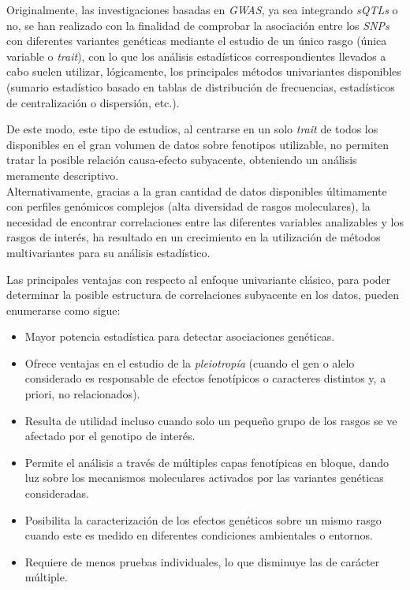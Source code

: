 \documentclass[IB,BIB]{TFUOC}%
\let\oldgls=\gls
\renewcommand{\gls}[1]{{\hypersetup{linkcolor=[RGB]{0,0,0}}
  \oldgls{#1}}}
\begin{document}

Originalmente, las investigaciones basadas en \textit{GWAS}, ya sea integrando \textit{sQTLs} o no, se han realizado con la finalidad de comprobar la asociación entre los \textit{SNPs} con diferentes variantes genéticas mediante el estudio de un único rasgo (única variable o \hspace{-.5em}\textit{\gls{trait}}), con lo que los análisis estadísticos correspondientes llevados a cabo suelen utilizar, lógicamente, los principales métodos univariantes disponibles (sumario estadístico basado en tablas de distribución de frecuencias, estadísticos de centralización o dispersión, etc.).

De este modo, este tipo de estudios, al centrarse en un solo \textit{trait} de todos los disponibles en el gran volumen de datos sobre fenotipos utilizable, no permiten tratar la posible relación causa-efecto subyacente, obteniendo un análisis meramente descriptivo. \\


Alternativamente, gracias a la gran cantidad de datos disponibles últimamente con perfiles genómicos complejos (alta diversidad de rasgos moleculares), la necesidad de encontrar correlaciones entre las diferentes variables analizables y los rasgos de interés, ha resultado en un crecimiento en la utilización de métodos multivariantes para su análisis estadístico.

Las principales ventajas con respecto al enfoque univariante clásico, para poder determinar la posible estructura de correlaciones subyacente en los datos, pueden enumerarse como sigue:

{\small
\begin{itemize}
    \item Mayor potencia estadística para detectar asociaciones genéticas.
    \item Ofrece ventajas en el estudio de la \hspace{-.25em}\textit{\gls{pleiotropía}} (cuando el gen o alelo considerado es responsable de efectos fenotípicos o caracteres distintos y, a priori, no relacionados).
    \item Resulta de utilidad incluso cuando solo un pequeño grupo de los rasgos se ve afectado por el genotipo de interés.
    \item Permite el análisis a través de múltiples capas fenotípicas en bloque, dando luz sobre los mecanismos moleculares activados por las variantes genéticas consideradas.
    \item Posibilita la caracterización de los efectos genéticos sobre un mismo rasgo cuando este es medido en diferentes condiciones ambientales o entornos.
    \item Requiere de menos pruebas individuales, lo que disminuye las de carácter múltiple.
\end{itemize}}
\end{document}
